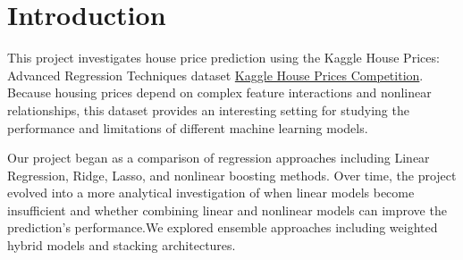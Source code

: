 \documentclass{article}
\begin{document}

\begin{abstract}

This project investigates house price prediction using the Kaggle House Prices dataset, with a focus on comparing linear, nonlinear, and ensemble-based machine learning models. We evaluated Linear Regression, Ridge, Lasso, Gradient Boosting, and XGBoost, together with hybrid and stacking approaches. Our preprocessing pipeline included missing value handling, categorical feature encoding, and feature transformation. We found that purely linear models were insufficient for capturing complex relationships in housing data, while nonlinear ensemble methods significantly improved prediction performance. Furthermore, combining linear and nonlinear models through hybrid averaging and stacking produced more stable and accurate predictions than individual models. Our results highlight the importance of feature engineering and ensemble learning in structured regression tasks.

\end{abstract}

\section{Introduction}

This project investigates house price prediction using the Kaggle House Prices: Advanced Regression Techniques dataset \href{https://www.kaggle.com/competitions/house-prices-advanced-regression-techniques}
{Kaggle House Prices Competition}. Because housing prices depend on complex feature interactions and nonlinear relationships, this dataset provides an interesting setting for studying the performance and limitations of different machine learning models.

Our project began as a comparison of regression approaches including Linear Regression, Ridge, Lasso, and nonlinear boosting methods. Over time, the project evolved into a more analytical investigation of when linear models become insufficient and whether combining linear and nonlinear models can improve the prediction's performance.We explored ensemble approaches including weighted hybrid models and stacking architectures.
\end{document}
